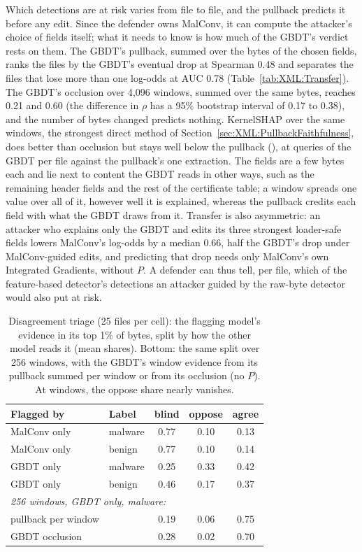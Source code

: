 Which detections are at risk varies from file to file, and the pullback predicts it before any edit. Since the defender
owns MalConv, it can compute the attacker's choice of fields itself; what it needs to know is how much of the GBDT's
verdict rests on them. The GBDT's pullback, summed over the bytes of the chosen fields, ranks the files by the GBDT's
eventual drop at Spearman 0.48 and separates the files that lose more than one log-odds at AUC 0.78
(Table~\ref{tab:XML:Transfer}). The GBDT's occlusion over 4{,}096 windows, summed over the same bytes, reaches 0.21 and
0.60 (the difference in $\rho$ has a 95\% bootstrap interval of 0.17 to 0.38), and the number of bytes changed predicts
nothing. KernelSHAP over the same windows, the strongest direct method of Section~\ref{sec:XML:PullbackFaithfulness},
does better than occlusion but stays well below the pullback (), at  queries of the GBDT per file against the
pullback's one extraction. The fields are a few bytes each and lie next to content the GBDT reads in other ways, such
as the remaining header fields and the rest of the certificate table; a window spreads one value over all of it,
however well it is explained, whereas the pullback credits each field with what the GBDT draws from it. Transfer is also asymmetric: an attacker who explains only the GBDT
and edits its three strongest loader-safe fields lowers MalConv's log-odds by a median 0.66, half the GBDT's drop
under MalConv-guided edits, and predicting that drop needs only MalConv's own Integrated Gradients, without $P$. A
defender can thus tell, per file, which of the feature-based detector's detections an attacker guided by the raw-byte
detector would also put at risk.

\begin{table}[t]
  \centering
  \small
  \begin{tabular}{llccc}
    \toprule
    Flagged by & Label & blind & oppose & agree \\
    \midrule
    MalConv only & malware & 0.77 & 0.10 & 0.13 \\
    MalConv only & benign & 0.77 & 0.10 & 0.14 \\
    GBDT only & malware & 0.25 & 0.33 & 0.42 \\
    GBDT only & benign & 0.46 & 0.17 & 0.37 \\
    \midrule
    \multicolumn{5}{l}{\textit{256 windows, GBDT only, malware:}} \\
    \quad pullback per window & & 0.19 & 0.06 & 0.75 \\
    \quad GBDT occlusion & & 0.28 & 0.02 & 0.70 \\
    \bottomrule
  \end{tabular}
  \caption{Disagreement triage (25 files per cell): the flagging model's evidence in its top 1\% of bytes, split by how
  the other model reads it (mean shares). Bottom: the same split over 256 windows, with the GBDT's window evidence from
  its pullback summed per window or from its occlusion (no $P$). At windows, the oppose share nearly vanishes.}
  \label{tab:XML:Triage}
\end{table}

